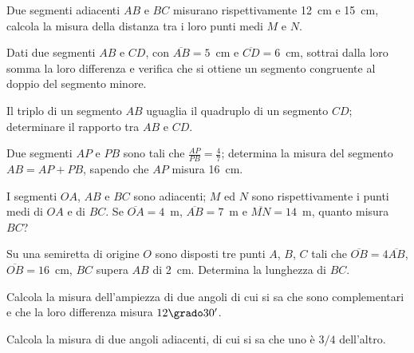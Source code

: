 \begin{multicols}{2}
\begin{esercizio}
\label{ese:1.104}
Due segmenti adiacenti \(AB\) e \(BC\) misurano rispettivamente 12~cm e 
15~cm, calcola la misura della distanza tra i loro punti medi \(M\) e 
\(N\).
\end{esercizio}

\begin{esercizio}
\label{ese:1.105}
Dati due segmenti \(AB\) e \(CD\), con \(\overline{AB} = 5\)~cm e 
\(\overline{CD} = 6\)~cm, sottrai dalla loro somma la loro differenza e 
verifica che si ottiene un segmento congruente al doppio del segmento 
minore.
\end{esercizio}

\begin{esercizio}
\label{ese:1.106}
Il triplo di un segmento \(AB\) uguaglia il quadruplo di un segmento 
\(CD\); determinare il rapporto tra \(AB\) e \(CD\).
\end{esercizio}

\begin{esercizio}
\label{ese:1.107}
Due segmenti \(AP\) e \(PB\) sono tali che \(\frac{AP}{PB}=\frac{4}{7}\); 
determina la misura del segmento \(AB=AP+PB\), sapendo che \(AP\) misura 
16~cm.
\end{esercizio}

\begin{esercizio}
\label{ese:1.108}
I segmenti \(OA\), \(AB\) e \(BC\) sono adiacenti; \(M\) ed \(N\) sono 
rispettivamente i punti medi di \(OA\) e di \(BC\). Se 
\(\overline{OA}=4\)~m, \(\overline{AB}=7\)~m e \(\overline{MN}=14\)~m, 
quanto misura \(BC\)?
\end{esercizio}

\begin{esercizio}
\label{ese:1.109}
Su una semiretta di origine \(O\) sono disposti tre punti \(A\), \(B\), \(C\) 
tali che \(\overline{OB}=4\overline{AB}\), \(\overline{OB}=16\)~cm, \(BC\) 
supera \(AB\) di 2~cm. Determina la lunghezza di \(BC\).
\end{esercizio}

\begin{esercizio}
\label{ese:1.110}
Calcola la misura dell'ampiezza di due angoli di cui si sa che sono 
complementari e che la loro differenza misura \(12\grado30'\).
\end{esercizio}
 
\begin{esercizio}
\label{ese:1.111}
Calcola la misura di due angoli adiacenti, di cui si sa che uno è 
\(3/4\) dell'altro.
\end{esercizio}


\end{multicols}
